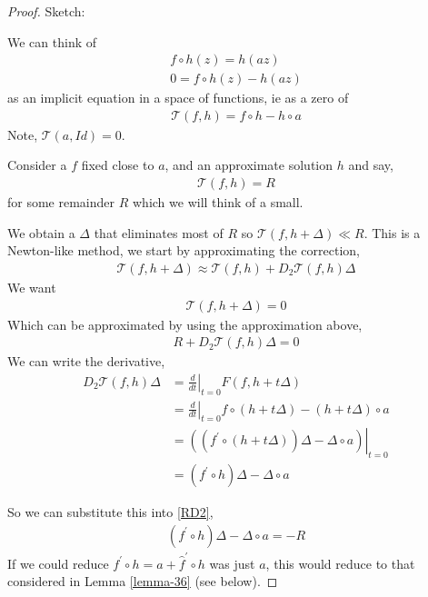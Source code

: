 \documentclass{article}
\theoremstyle{plain}
\theoremstyle{remark}
\begin{document}
\bigskip


\begin{proof}
Sketch:

We can think of 
\begin{align*}
f \circ h(z) = h(az)\\
0 = f \circ h(z) - h(az)
\end{align*}
as an implicit equation in a space of functions, ie as a zero of 
\begin{align*}
\mathcal{T}(f,h) = f \circ h - h \circ a
\end{align*}
Note, $\mathcal{T}(a, Id) = 0$.

Consider a $f$ fixed close to $a$, and an approximate solution $h$ and say,
\begin{align}\label{T=R}
\mathcal{T}\left(f,h\right) = R
\end{align}
for some remainder $R$ which we will think of a small.

We obtain a $\Delta$ that eliminates most of $R$ so $\mathcal{T}\left(f, h + \Delta\right) \ll R$. 
This is a Newton-like method, we start by approximating the correction,
\begin{align*}
\mathcal{T}\left( f , h + \Delta \right) \approx \mathcal{T} \left( f, h \right) + D_2 \mathcal{T} \left( f, h \right) \Delta
\end{align*}
We want 
\begin{align*}
\mathcal{T} \left(f, h + \Delta \right) = 0
\end{align*}
Which can be approximated by using the approximation above,
\begin{align}\label{RD2}
R + D_2 \mathcal{T}\left( f, h \right)\Delta = 0
\end{align}
We can write the derivative,
\begin{align*}
D_2\mathcal{T} \left( f , h \right) \Delta &= \left.\frac{d}{dt}\right|_{t=0}F(f,h+t\Delta) \\
&= \left.\frac{d}{dt}\right|_{t=0} f \circ (h + t\Delta) - (h + t\Delta)\circ a\\
&= \left.\left(\left(f^\prime \circ (h + t\Delta)\right)\Delta - \Delta\circ a \right)\right|_{t = 0}\\
&= \left( f^\prime \circ h \right) \Delta - \Delta \circ a
\end{align*}

So we can substitute this into \ref{RD2},
\begin{align*}
\left( f^\prime \circ h \right) \Delta - \Delta \circ a = - R
\end{align*}
If we could reduce $f^\prime \circ h = a + \hat{f}^\prime \circ h$ was just $a$, this would reduce to that considered in Lemma \ref{lemma-36} (see below). 


\end{proof}
\end{document}
